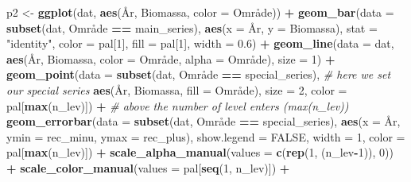 \documentclass[]{article}
\newenvironment{Shaded}{\begin{snugshade}}{\end{snugshade}}
\newcommand{\KeywordTok}[1]{\textcolor[rgb]{0.13,0.29,0.53}{\textbf{#1}}}
\newcommand{\DataTypeTok}[1]{\textcolor[rgb]{0.13,0.29,0.53}{#1}}
\newcommand{\DecValTok}[1]{\textcolor[rgb]{0.00,0.00,0.81}{#1}}
\newcommand{\FloatTok}[1]{\textcolor[rgb]{0.00,0.00,0.81}{#1}}
\newcommand{\StringTok}[1]{\textcolor[rgb]{0.31,0.60,0.02}{#1}}
\newcommand{\CommentTok}[1]{\textcolor[rgb]{0.56,0.35,0.01}{\textit{#1}}}
\newcommand{\OtherTok}[1]{\textcolor[rgb]{0.56,0.35,0.01}{#1}}
\newcommand{\OperatorTok}[1]{\textcolor[rgb]{0.81,0.36,0.00}{\textbf{#1}}}
\newcommand{\NormalTok}[1]{#1}
\begin{document}
\begin{Shaded}
\begin{Highlighting}[]
\NormalTok{p2 <-}\StringTok{ }\KeywordTok{ggplot}\NormalTok{(dat, }\KeywordTok{aes}\NormalTok{(År, Biomassa, }\DataTypeTok{color =}\NormalTok{ Område)) }\OperatorTok{+}
\StringTok{  }\KeywordTok{geom_bar}\NormalTok{(}\DataTypeTok{data =} \KeywordTok{subset}\NormalTok{(dat, Område }\OperatorTok{==}\StringTok{ }\NormalTok{main_series), }
           \KeywordTok{aes}\NormalTok{(}\DataTypeTok{x =}\NormalTok{ År, }\DataTypeTok{y =}\NormalTok{ Biomassa), }\DataTypeTok{stat =} \StringTok{"identity"}\NormalTok{, }\DataTypeTok{color =}\NormalTok{ pal[}\DecValTok{1}\NormalTok{], }\DataTypeTok{fill =}\NormalTok{ pal[}\DecValTok{1}\NormalTok{], }
           \DataTypeTok{width =} \FloatTok{0.6}\NormalTok{) }\OperatorTok{+}
\StringTok{  }\KeywordTok{geom_line}\NormalTok{(}\DataTypeTok{data =}\NormalTok{ dat, }\KeywordTok{aes}\NormalTok{(År, Biomassa, }\DataTypeTok{color =}\NormalTok{ Område, }\DataTypeTok{alpha =}\NormalTok{ Område), }
            \DataTypeTok{size =} \DecValTok{1}\NormalTok{) }\OperatorTok{+}\StringTok{ }
\StringTok{  }\KeywordTok{geom_point}\NormalTok{(}\DataTypeTok{data =} \KeywordTok{subset}\NormalTok{(dat, Område }\OperatorTok{==}\StringTok{ }\NormalTok{special_series), }\CommentTok{# here we set our special series}
             \KeywordTok{aes}\NormalTok{(År, Biomassa, }\DataTypeTok{fill =}\NormalTok{ Område), }\DataTypeTok{size =} \DecValTok{2}\NormalTok{, }\DataTypeTok{color =}\NormalTok{ pal[}\KeywordTok{max}\NormalTok{(n_lev)]) }\OperatorTok{+}\StringTok{ }
\StringTok{  }\CommentTok{# above the number of level enters (max(n_lev))}
\StringTok{  }\KeywordTok{geom_errorbar}\NormalTok{(}\DataTypeTok{data =} \KeywordTok{subset}\NormalTok{(dat, Område }\OperatorTok{==}\StringTok{ }\NormalTok{special_series), }
                \KeywordTok{aes}\NormalTok{(}\DataTypeTok{x =}\NormalTok{ År, }\DataTypeTok{ymin =}\NormalTok{ rec_minu, }\DataTypeTok{ymax =}\NormalTok{ rec_plus), }
                \DataTypeTok{show.legend =} \OtherTok{FALSE}\NormalTok{, }\DataTypeTok{width  =} \DecValTok{1}\NormalTok{, }\DataTypeTok{color =}\NormalTok{ pal[}\KeywordTok{max}\NormalTok{(n_lev)]) }\OperatorTok{+}
\StringTok{  }\KeywordTok{scale_alpha_manual}\NormalTok{(}\DataTypeTok{values =} \KeywordTok{c}\NormalTok{(}\KeywordTok{rep}\NormalTok{(}\DecValTok{1}\NormalTok{, (n_lev}\OperatorTok{-}\DecValTok{1}\NormalTok{)), }\DecValTok{0}\NormalTok{)) }\OperatorTok{+}\StringTok{ }
\StringTok{  }\KeywordTok{scale_color_manual}\NormalTok{(}\DataTypeTok{values =}\NormalTok{ pal[}\KeywordTok{seq}\NormalTok{(}\DecValTok{1}\NormalTok{, n_lev)]) }\OperatorTok{+}

\end{Highlighting}
\end{Shaded}
\end{document}
